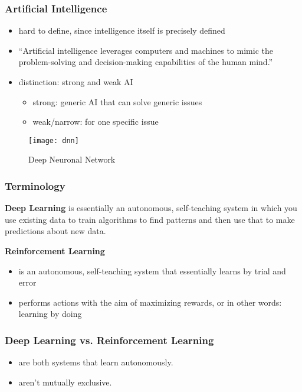\begin{frame}
    \frametitle{Artificial Intelligence}

    \begin{itemize}
        \item hard to define, since intelligence itself is precisely defined
        \item ``Artificial intelligence leverages computers and machines to mimic the problem-solving and decision-making capabilities of the human mind.''
        \item distinction: strong and weak AI
        \begin{itemize}
            \item strong: generic AI that can solve generic issues
            \item weak/narrow: for one specific issue
        \end{itemize}
    \end{itemize}

    \begin{figure}
        \texttt{[image: dnn]}
        \caption{Deep Neuronal Network}
        \label{fig:dnn}
    \end{figure}
\end{frame}

\begin{frame}
    \frametitle{Terminology}
    \textbf{Deep Learning}
    is essentially an autonomous, self-teaching system in which you use existing data to train algorithms
    to find patterns and then use that to make predictions about new data.

    \textbf{Reinforcement Learning}
    \begin{itemize}
        \item is an autonomous, self-teaching system that essentially learns by trial and error
        \item performs actions with the aim of maximizing rewards, or in other words: learning by doing
    \end{itemize}

    \frametitle{Deep Learning vs. Reinforcement Learning}
    \begin{itemize}
        \item are both systems that learn autonomously.
        \item aren’t mutually exclusive.
    \end{itemize}
\end{frame}

